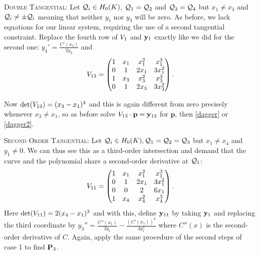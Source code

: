 \begin{case}
	{\scshape Double Tangential:} Let $\q_i \in \enk$, $\q_1 = \q_2$ and $\q_3 = \q_4$ but $x_1 \neq x_3$ and $\q_i \neq \pm \q_i$ meaning that neither $y_1$ nor $y_3$ will be zero. As before, we lack equations for our linear system, requiring the use of a second tangential constraint. Replace the fourth row of $\Vdoub$ and $\ydoub$ exactly like we did for the second one: $y_4'=\frac{C'(x_3)}{2 y_3}$ and
	\begin{align*}\Vddoub=
		\begin{pmatrix}
			1 & x_1 & x_1^2 & x_1^3\\
			0 & 1 & 2 x_1 & 3 x_1^2\\
			1 & x_3 & x_3^2 & x_3^3\\
			0 & 1 & 2 x_3 & 3 x_3^2\\
		\end{pmatrix}.
	\end{align*}

	Now $\det(\Vddoub)=(x_3-x_1)^4$ and this is again different from zero precisely whenever $x_3 \neq x_1$, so as before solve $\Vddoub \cdot \mathbf{p} = \yddoub$ for $\mathbf{p}$, then \eqref{dagger} or \eqref{dagger2}.
\end{case}

\begin{case}
	{\scshape Second Order Tangential:} Let $\q_i \in \enk , \q_1=\q_2=\q_3$ but $x_1 \neq x_4$ and $y_1 \neq 0$. We can thus see this as a third-order intersection and demand that the curve and the polynomial share a second-order derivative at $\q_1$:
	\begin{align*}\Vtri=
			\begin{pmatrix}
			1 & x_1 & x_1^2 & x_1^3\\
			0 & 1 & 2 x_1 & 3 x_1^2\\
			0 & 0 & 2 & 6x_1\\
			1 & x_4 & x_4^2 & x_4^3\\
		\end{pmatrix}.
	\end{align*}
	Here $\det(\Vtri)=2(x_4-x_1)^3$ and with this, define $\ytri$ by taking $\ydoub$ and replacing the third coordinate by $y_3'' = \frac{C''(x_1)}{2y_1}-\frac{(C'(x_1))^2}{4y_1^3}$ where $C''(x)$ is the second-order derivative of $C$. Again, apply the same procedure of the second steps of case 1 to find $\P_3$.

\end{case}


